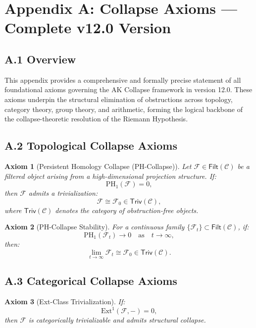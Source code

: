 \documentclass[11pt]{article}
\newtheorem{axiom}{Axiom}[section]
\begin{document}
\section*{Appendix A: Collapse Axioms — Complete v12.0 Version}

\subsection*{A.1 Overview}

This appendix provides a comprehensive and formally precise statement of all foundational axioms governing the AK Collapse framework in version 12.0. These axioms underpin the structural elimination of obstructions across topology, category theory, group theory, and arithmetic, forming the logical backbone of the collapse-theoretic resolution of the Riemann Hypothesis.

\subsection*{A.2 Topological Collapse Axioms}

\begin{axiom}[Persistent Homology Collapse (PH-Collapse)]
Let $\mathcal{F} \in \mathsf{Filt}(\mathcal{C})$ be a filtered object arising from a high-dimensional projection structure. If:
\[
\mathrm{PH}_1(\mathcal{F}) = 0,
\]
then $\mathcal{F}$ admits a trivialization:
\[
\mathcal{F} \cong \mathcal{F}_0 \in \mathsf{Triv}(\mathcal{C}),
\]
where $\mathsf{Triv}(\mathcal{C})$ denotes the category of obstruction-free objects.
\end{axiom}

\begin{axiom}[PH-Collapse Stability]
For a continuous family $\{ \mathcal{F}_t \} \subset \mathsf{Filt}(\mathcal{C})$, if:
\[
\mathrm{PH}_1(\mathcal{F}_t) \longrightarrow 0 \quad \text{as} \quad t \to \infty,
\]
then:
\[
\lim_{t \to \infty} \mathcal{F}_t \cong \mathcal{F}_0 \in \mathsf{Triv}(\mathcal{C}).
\]
\end{axiom}

\subsection*{A.3 Categorical Collapse Axioms}

\begin{axiom}[Ext-Class Trivialization]
If:
\[
\mathrm{Ext}^1(\mathcal{F}, -) = 0,
\]
then $\mathcal{F}$ is categorically trivializable and admits structural collapse.
\end{axiom}
\end{document}
